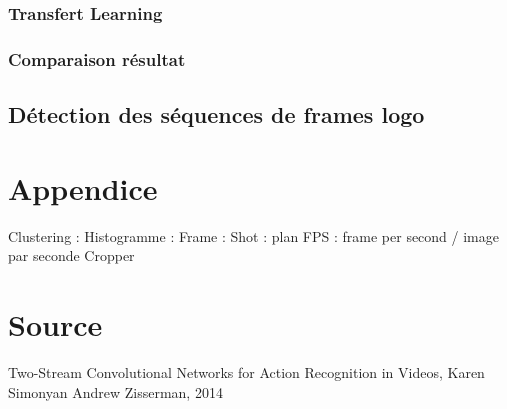 \documentclass[11pt]{article}
\begin{document}
\subsubsection{Transfert Learning}
\label{sec-8-4-3}
\subsubsection{Comparaison résultat}
\label{sec-8-4-4}

\subsection{Détection des séquences de frames logo}
\label{sec-8-5}

\section{Appendice}
\label{sec-9}
Clustering :
Histogramme : 
Frame : 
Shot : plan
FPS : frame per second / image par seconde
Cropper

\section{Source}
\label{sec-10}
Two-Stream Convolutional Networks for Action Recognition in Videos, Karen Simonyan Andrew Zisserman, 2014
\end{document}
